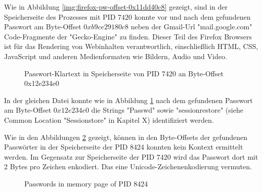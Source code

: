 Wie in Abbildung \ref{img:firefox-pw-offset-0x11dd40c8} gezeigt, sind in der Speicherseite des Prozesses mit PID $7420$ konnte vor und nach dem gefundenen Passwort am Byte-Offset $0xb9ce29180c8$ neben der Gmail-Url "mail.google.com" Code-Fragmente der "Gecko-Engine" zu finden. Dieser Teil des Firefox Browsers ist für das Rendering von Webinhalten verantwortlich, einschließlich HTML, CSS, JavaScript und anderen Medienformaten wie Bildern, Audio und Video.
\begin{figure}[h!]
	\centerline{}
	\label{img:firefox-pw-offset-pid-7420-0x12e234e0}  
	\caption{Passwort-Klartext in Speicherseite von PID 7420 an Byte-Offset 0x12e234e0}
\end{figure}
In der gleichen Datei konnte wie in Abbildung \ref{img:firefox-pw-offset-pid-7420-0x12e234e0} nach dem gefundenen Passwort am Byte-Offset $0x12e234e0$ die Strings "Passwd" sowie "sessionrestore" (siehe Common Location "Sessionstore" in Kapitel X) identifiziert werden. 

Wie in den Abbildungen \ref{img:firefox-pw-offset-pid-8424} gezeigt, können in den Byte-Offsets der gefundenen Passwörter in der Speicherseite der PID 8424 konnten kein Kontext ermittelt werden. Im Gegensatz zur Speicherseite der PID 7420 wird das Passwort dort mit 2 Bytes pro Zeichen enkodiert. Das eine Unicode-Zeichenenkodierung vermuten.
\begin{figure}
	\centering
	\hfill
	\label{img:firefox-pw-offset-pid-8424}  
	\caption{Passwords in memory page of PID 8424}
\end{figure}

